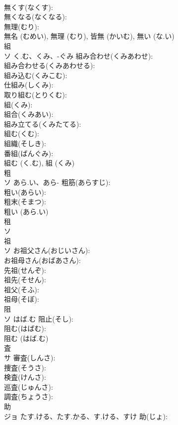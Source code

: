 \documentclass[8pt]{extreport}
\begin{document}
\begin{CJK}{UTF8}{min}
\\	無くす(なくす): 
\\	無くなる(なくなる): 
\\	無理(むり): 
\\	無名 (むめい), 無理 (むり), 皆無 (かいむ), 無い (な.い)
\\	組			
\\	ソ	く.む、くみ、-ぐみ	組み合わせ(くみあわせ): 
\\	組み合わせる(くみあわせる): 
\\	組み込む(くみこむ): 
\\	仕組み(しくみ): 
\\	取り組む(とりくむ): 
\\	組(くみ): 
\\	組合(くみあい): 
\\	組み立てる(くみたてる): 
\\	組む(くむ): 
\\	組織(そしき): 
\\	番組(ばんぐみ): 
\\	組む (く.む), 組 (くみ)
\\	粗			
\\	ソ	あら.い、あら-	粗筋(あらすじ): 
\\	粗い(あらい): 
\\	粗末(そまつ): 
\\	粗い (あら.い)
\\	租			
\\	ソ			
\\	祖			
\\	ソ		お祖父さん(おじいさん): 
\\	お祖母さん(おばあさん): 
\\	先祖(せんぞ): 
\\	祖先(そせん): 
\\	祖父(そふ): 
\\	祖母(そぼ): 
\\	阻			
\\	ソ	はば.む	阻止(そし): 
\\	阻む(はばむ): 
\\	阻む (はば.む)
\\	査			
\\	サ		審査(しんさ): 
\\	捜査(そうさ): 
\\	検査(けんさ): 
\\	巡査(じゅんさ): 
\\	調査(ちょうさ): 
\\	助			
\\	ジョ	たす.ける、たす.かる、す.ける、すけ	助(じょ): 

\end{CJK}
\end{document}

